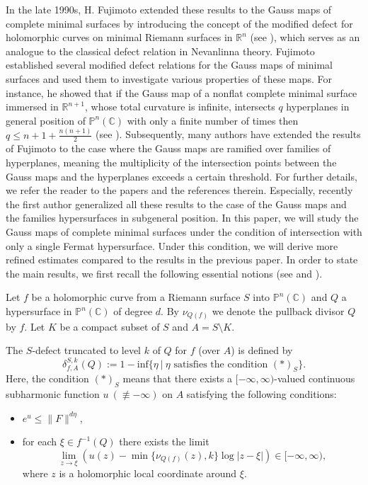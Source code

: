 \documentclass[12pt,article]{amsart}
\newcommand{\C}{{\mathbb{C}}}
\renewcommand{\P}{{\mathbb{P}}}
\newcommand{\R}{{\mathbb{R}}}
\numberwithin{equation}{section}
\begin{document}
In the late 1990s, H. Fujimoto extended these results to the Gauss maps of complete minimal surfaces by introducing the concept of the modified defect for holomorphic curves on minimal Riemann surfaces in $\R^n$ (see \cite{Fu89, Fu90, Fu91}), which serves as an analogue to the classical defect relation in Nevanlinna theory. Fujimoto established several modified defect relations for the Gauss maps of minimal surfaces and used them to investigate various properties of these maps. For instance, he showed that if the Gauss map of a nonflat complete minimal surface immersed in $\R^{n+1}$, whose total curvature is infinite, intersects $q$ hyperplanes in general position of $\P^{n}(\C)$ with only a finite number of times then $q\le n+1+\frac{n(n+1)}{2}$ (see \cite[Corollary 1.4]{Fu91}). Subsequently, many authors have extended the results of Fujimoto to the case where the Gauss maps are ramified over families of hyperplanes, meaning the multiplicity of the intersection points between the Gauss maps and the hyperplanes exceeds a certain threshold. For further details, we refer the reader to the papers \cite{Ha18a,Ha18b,HTP,Ru93} and the references therein. Especially, recently the first author \cite{Q24} generalized all these results to the case of the Gauss maps and the families hypersurfaces in subgeneral position. In this paper, we will study the Gauss maps of complete minimal surfaces under the condition of intersection with only a single Fermat hypersurface. Under this condition, we will derive more refined estimates compared to the results in the previous paper. In order to state the main results, we first recall the following essential notions (see \cite{Fu89,Fu90,Fu91} and \cite{Q24}).

 Let $f$ be a holomorphic curve from a Riemann surface $S$ into $\P^n(\C)$ and $Q$ a hypersurface in $\P^n(\C)$ of degree $d$. By $\nu_{Q(f)}$ we denote the pullback divisor $Q$ by $f$. 
Let $K$ be a compact subset of $S$ and $A=S\setminus K$. 

The $S$-defect truncated to level $k$ of $Q$ for $f$ (over $A$) is defined by 
$$\delta^{S,k}_{f,A}(Q):=1- \mathrm{inf}\{\eta\ |\ \eta \text{ satisfies the condition }(*)_S\}.$$
Here, the condition $(*)_S$ means that there exists a $[-\infty,\infty)$-valued continuous subharmonic function $u\ (\not\equiv -\infty)$ on $A$ satisfying the following conditions:
\begin{itemize}
\item[$(D_1)$] $e^u\le \|F\|^{d\eta}$,
\item [$(D_2)$] for each $\xi\in f^{-1}(Q)$ there exists the limit 
$$\underset{z\rightarrow\xi}\lim (u(z)-\min\{\nu_{Q(f)}(z),k\}\log|z -\xi|) \in[-\infty,\infty),$$
where $z$ is a holomorphic local coordinate around $\xi$.
\end{itemize}
\end{document}
